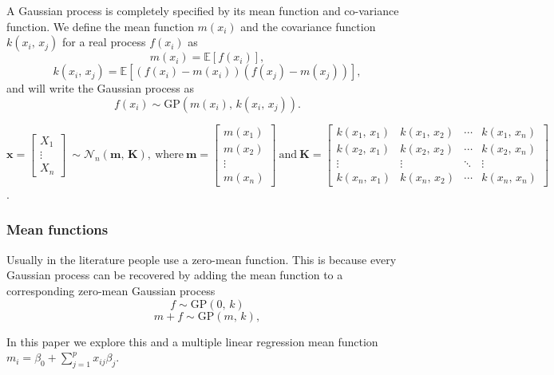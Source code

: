       \vspace{1em}

      A Gaussian process is completely specified by its mean function and co-variance function. We define the mean function \(m(x_{i})\) and the covariance function \(k(x_{i},\, x_{j})\) for a real process \(f(x_{i})\) as
      \[m(x_{i}) = \mathbb{E}[f(x_{i})],\]
      \[k(x_{i},\, x_{j}) = \mathbb{E}[(f(x_{i}) - m(x_{i}))(f(x_{j}) - m(x_{j}))],\]
      and will write the Gaussian process as
      \[f(x_{i}) \sim \text{GP}(m(x_{i}), \, k(x_{i},\, x_{j})).\]

      \(\mathbf{x} =
      \begin{bmatrix}
         X_{1} \\
         \vdots \\
         X_{n}
      \end{bmatrix}
      \:
      \sim \mathcal{N}_{n}(\mathbf{m}, \, \mathbf{K}),
      \:
      \text{where}
      \:
      \mathbf{m} = 
      \begin{bmatrix}
         m(x_{1}) \\
         m(x_{2}) \\
         \vdots \\
         m(x_{n})
      \end{bmatrix}  
      \: 
      \text{and}
      \:
      \mathbf{K} = 
      \begin{bmatrix}
         k(x_{1}, \, x_{1}) & k(x_{1}, \, x_{2}) & \cdots & k(x_{1}, \, x_{n}) \\
         k(x_{2}, \, x_{1}) & k(x_{2}, \, x_{2}) & \cdots & k(x_{2}, \, x_{n}) \\
         \vdots & \vdots & \ddots & \vdots \\
         k(x_{n}, \, x_{1}) & k(x_{n}, \, x_{2}) & \cdots & k(x_{n}, \, x_{n})
      \end{bmatrix}\).

      \subsubsection{Mean functions}

         Usually in the literature people use a zero-mean function. \cite{Betancourt2020} This is because every Gaussian process can be recovered by adding the mean function to a corresponding zero-mean Gaussian process \[f \sim \text{GP}(0,\, k)\] \[m + f \sim \text{GP}(m,\, k),\] 
         
         In this paper we explore this and a multiple linear regression mean function \(m_{i} = \beta_0 + \sum_{j=1}^{p}x_{ij} \beta_{j}\).

